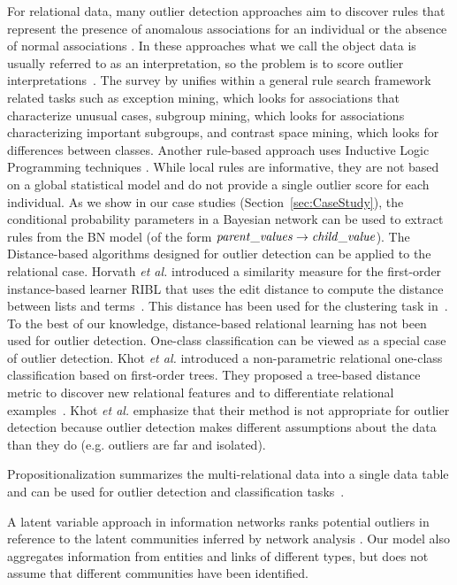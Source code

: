 {				For relational data, many outlier detection approaches aim to discover rules that represent the presence of anomalous associations for an individual or the absence of normal associations \citep{Maervoet2012,Gao2010}.    In these approaches what we call the object data is usually referred to as an interpretation, so the problem is to score outlier interpretations~\citep{Maervoet2012}. The survey by \citep{Novak2009} unifies within a general rule search framework related tasks such as exception mining, which looks for associations that characterize unusual cases, subgroup mining, which looks for associations  characterizing important subgroups, and contrast space mining, which looks for differences between classes. Another rule-based approach uses Inductive Logic Programming techniques \citep{Angiulli2007}.
				While local rules are informative, they are not based on a global statistical model and do not provide a single outlier score for each individual. As we show in our case studies (Section~\ref{sec:CaseStudy}), the conditional probability parameters in a Bayesian network can be used to extract rules  from the BN model (of the form $\it{parent\_values} \rightarrow \it{child\_value}$).
				The Distance-based algorithms designed for outlier detection can be applied to the relational case.  Horvath {\em et al.} introduced a similarity measure for the first-order instance-based learner RIBL that uses the edit distance to compute the distance between lists and terms~\citep{Horvath2001}. This distance has been used for the clustering task in~\citep{Kirsten2001}. To the best of our knowledge, distance-based relational learning has not been used for outlier detection. One-class classification can be viewed as a special case of outlier detection.  Khot {\em et al.} introduced a non-parametric relational one-class classification based on first-order trees. They proposed a tree-based distance metric to discover new relational features and to differentiate relational examples~\citep{Khot2014}. Khot {\em et al.} emphasize that their method is not appropriate for outlier detection because outlier detection makes different assumptions about the data than they do (e.g. outliers are far and isolated).  
				
				 Propositionalization summarizes the multi-relational data into a single data table and can be used for outlier detection and classification tasks~\citep{Kramer2000,Lavrac13,kuzelka2008,Riahi2016,AndersonP08}. 
				
				A latent variable approach in information networks ranks potential outliers in reference to the latent communities inferred by network analysis \citep{Gao2010}. Our model also aggregates information from entities and links of different types, but does not assume that different communities have been identified. 
				
}
